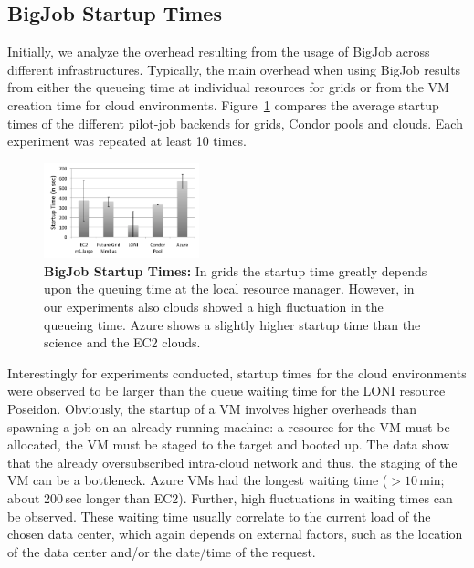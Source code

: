 \documentclass[conference,final]{IEEEtran}
\newcommand{\up}{\vspace*{-1em}}
\newcommand{\alnote}[1]{ {\textcolor{blue} { ***AL: #1 }}}
\newcommand{\jhanote}[1]{ {\textcolor{red} { ***SJ: #1 }}}
\newcommand{\alnote}[1]{}
\newcommand{\jhanote}[1]{}
\begin{document}
\subsection{BigJob Startup Times}
\up Initially, we analyze the overhead resulting from the usage of
BigJob across different infrastructures. Typically, the main overhead
when using BigJob results from either the queueing time at individual
resources for grids or from the VM creation time for cloud
environments.  Figure~\ref{fig:performance_setup_time} compares the
average startup times of the different pilot-job backends for grids,
Condor pools and clouds. Each experiment was repeated at least 10
times.

\begin{figure}[htbp]
    \centering
        \includegraphics[width=0.4\textwidth]{performance/setup-times}
    \caption{\textbf{BigJob Startup Times:} In grids the startup time
      greatly depends upon the queuing time at the local resource
      manager. However, in our experiments also clouds showed a high
      fluctuation in the queueing time. Azure shows a slightly higher
      startup time than the science and the EC2 clouds.\up}
    \label{fig:performance_setup_time}
\end{figure}

Interestingly for experiments conducted,  startup times for the
cloud environments were observed to be larger than the queue waiting
time for the LONI resource Poseidon. %
Obviously, the startup of a
VM involves higher overheads than spawning a job on an already running
machine: a resource for the VM must be allocated, the VM must be
staged to the target and booted up. The data show that
the already oversubscribed intra-cloud network and thus, the staging
of the VM can be a bottleneck. Azure VMs had the longest waiting time
($>10$\,min; about 200\,sec longer than EC2).
Further, high fluctuations in waiting times can be observed. These
waiting time usually correlate to the current load of the chosen data
center, which again depends on external factors, such as the location
of the data center and/or the date/time of the request.
\end{document}
